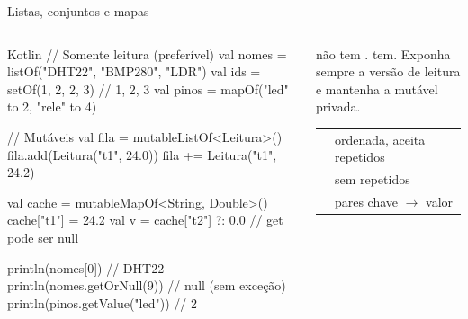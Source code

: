 \documentclass[aspectratio=169,10pt]{beamer}
\begin{document}
\begin{frame}[fragile]{Listas, conjuntos e mapas}
  \begin{columns}[T]
    \begin{column}{0.52\textwidth}
\begin{codigo}[title=Coleções]{Kotlin}
// Somente leitura (preferível)
val nomes = listOf("DHT22", "BMP280", "LDR")
val ids = setOf(1, 2, 2, 3)          // {1, 2, 3}
val pinos = mapOf("led" to 2, "rele" to 4)

// Mutáveis
val fila = mutableListOf<Leitura>()
fila.add(Leitura("t1", 24.0))
fila += Leitura("t1", 24.2)

val cache = mutableMapOf<String, Double>()
cache["t1"] = 24.2
val v = cache["t2"] ?: 0.0     // get pode ser null

println(nomes[0])              // DHT22
println(nomes.getOrNull(9))    // null (sem exceção)
println(pinos.getValue("led")) // 2
\end{codigo}
    \end{column}
    \begin{column}{0.46\textwidth}
      \begin{conceito}
         não tem .  tem. Exponha sempre a versão de leitura e mantenha a mutável privada.
      \end{conceito}
      \footnotesize
      \begin{tabularx}{\linewidth}{@{}l L@{}}
        \toprule
         &  \\
        \midrule
         & ordenada, aceita repetidos \\
         & sem repetidos \\
         & pares chave $\rightarrow$ valor \\
        \bottomrule
      \end{tabularx}
    \end{column}
  \end{columns}
\end{frame}
\end{document}
